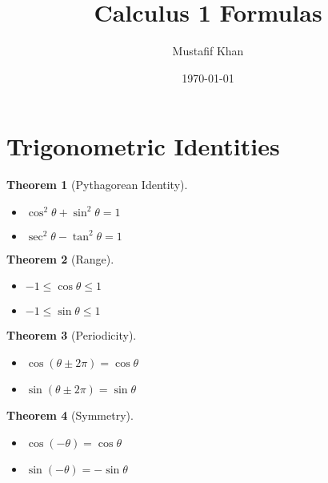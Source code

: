 \documentclass[12pt, letterpaper]{article}
\title{Calculus 1 Formulas}
\author{Mustafif Khan}
\date{\today}
\theoremstyle{break}
\newtheorem{theorem}{Theorem}
\begin{document}
\maketitle
{}
\newpage
\tableofcontents
\newpage
\section{Trigonometric Identities}
%
\begin{theorem}[Pythagorean Identity]
    \begin{itemize}
        \item $\cos^2\theta + \sin^2\theta = 1$
        \item $\sec^2\theta - \tan^2\theta = 1$
    \end{itemize}
\end{theorem}
%
\begin{theorem}[Range]
    \begin{itemize}
        \item $-1 \leq \cos\theta \leq 1 $
        \item $-1 \leq \sin\theta \leq 1$
    \end{itemize}
\end{theorem}
%
\begin{theorem}[Periodicity]
    \begin{itemize}
        \item $\cos(\theta \pm 2\pi) = \cos\theta$
        \item $\sin(\theta \pm 2\pi) = \sin\theta$
    \end{itemize}
\end{theorem}
%
\begin{theorem}[Symmetry]
    \begin{itemize}
        \item $\cos(-\theta) = \cos\theta$
        \item $\sin(-\theta) = -\sin\theta$
    \end{itemize}
\end{theorem}
\end{document}
